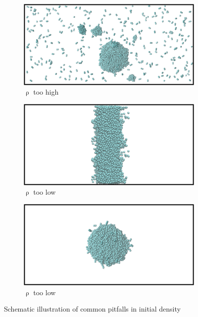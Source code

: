 \documentclass{scrbook}
\begin{document}
\begin{figure}
	\centering
	\begin{subfigure}{0.4\textwidth} %
    \includegraphics[width=1\textwidth]{gfx/image70.png} 
    \caption{${\uprho}$ too high}
	\end{subfigure}
	\begin{subfigure}{0.4\textwidth} %
    \includegraphics[width=1\textwidth]{gfx/image71.png}
    \caption{${\uprho}$ too low}
	\end{subfigure}
	\begin{subfigure}{0.4\textwidth} %
    \includegraphics[width=1\textwidth]{gfx/image72.png}
    \caption{${\uprho}$ too low}
	\end{subfigure}
\caption{Schematic illustration of common pitfalls in initial density}
\label{fig:23}
\end{figure}
\end{document}
